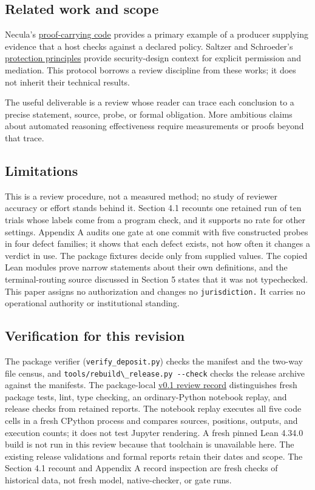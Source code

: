\documentclass[
  11pt,
]{article}
\newcommand{\passthrough}[1]{#1}
\begin{document}
\subsection{Related work and scope}\label{related-work-and-scope}

Necula's \href{https://doi.org/10.1145/263699.263712}{proof-carrying
code} provides a primary example of a producer supplying evidence that a
host checks against a declared policy. Saltzer and Schroeder's
\href{https://doi.org/10.1109/PROC.1975.9939}{protection principles}
provide security-design context for explicit permission and mediation.
This protocol borrows a review discipline from these works; it does not
inherit their technical results.

The useful deliverable is a review whose reader can trace each
conclusion to a precise statement, source, probe, or formal obligation.
More ambitious claims about automated reasoning effectiveness require
measurements or proofs beyond that trace.

\subsection{Limitations}\label{limitations}

This is a review procedure, not a measured method; no study of reviewer
accuracy or effort stands behind it. Section 4.1 recounts one retained
run of ten trials whose labels come from a program check, and it
supports no rate for other settings. Appendix A audits one gate at one
commit with five constructed probes in four defect families; it shows
that each defect exists, not how often it changes a verdict in use. The
package fixtures decide only from supplied values. The copied Lean
modules prove narrow statements about their own definitions, and the
terminal-routing source discussed in Section 5 states that it was not
typechecked. This paper assigns no authorization and changes no
\nolinkurl{jurisdiction.} It carries no operational authority or
institutional standing.

\subsection{Verification for this
revision}\label{verification-for-this-revision}

The package verifier (\nolinkurl{verify_deposit.py}) checks the manifest
and the two-way file census, and
\passthrough{\lstinline!tools/rebuild\_release.py --check!} checks the
release archive against the manifests. The package-local
\href{docs/v01_review_2026_10_02.json}{v0.1 review record} distinguishes
fresh package tests, lint, type checking, an ordinary-Python notebook
replay, and release checks from retained reports. The notebook replay
executes all five code cells in a fresh CPython process and compares
sources, positions, outputs, and execution counts; it does not test
Jupyter rendering. A fresh pinned Lean 4.34.0 build is not run in this
review because that toolchain is unavailable here. The existing release
validations and formal reports retain their dates and scope. The Section
4.1 recount and Appendix A record inspection are fresh checks of
historical data, not fresh model, native-checker, or gate runs.
\end{document}
